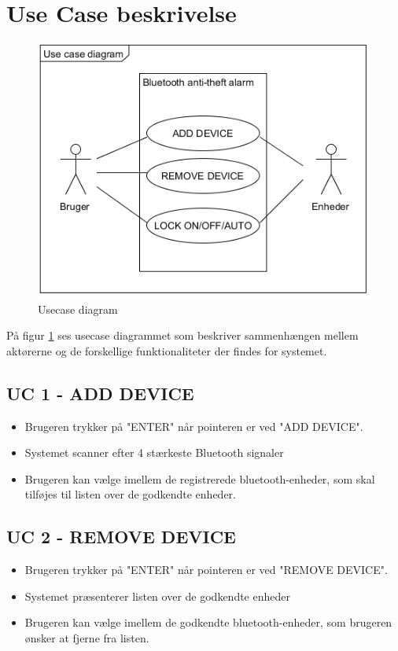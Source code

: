 \section{Use Case beskrivelse}

\begin{figure}[H]
	\centering
	\includegraphics[width = 300 pt]{Img/Usecase_Diagram.png}
	\caption{Usecase diagram}
	\label{fig:Usecase diagram}
\end{figure}

På figur \ref{fig:Usecase diagram} ses usecase diagrammet som beskriver sammenhængen mellem aktørerne og de forskellige funktionaliteter der findes for systemet.

\subsection{UC 1 - ADD DEVICE}
\begin{itemize}
\item Brugeren trykker på "ENTER" når pointeren er ved "ADD DEVICE".
\item Systemet scanner efter 4 stærkeste Bluetooth signaler
\item Brugeren kan vælge imellem de registrerede bluetooth-enheder, som skal tilføjes til listen over de godkendte enheder.
\end{itemize}


\subsection{UC 2 - REMOVE DEVICE}

\begin{itemize}
	\item Brugeren trykker på "ENTER" når pointeren er ved "REMOVE DEVICE".
	\item Systemet præsenterer listen over de godkendte enheder
	\item Brugeren kan vælge imellem de godkendte bluetooth-enheder, som brugeren ønsker at fjerne fra listen.
\end{itemize} 

